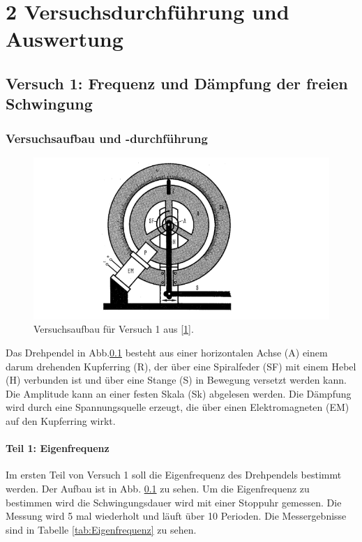 \chapter*{2 Versuchsdurchführung und Auswertung}
\setcounter{chapter}{2}
\setcounter{section}{0}
\setcounter{subsection}{0}

\section{Versuch 1: Frequenz und Dämpfung der freien Schwingung}

    \subsection{Versuchsaufbau und -durchführung}

        \begin{figure}[H]
            \centering
            \includegraphics[width=\textwidth]{bilder/aufbau_v1.png}
            \caption{Versuchsaufbau für Versuch 1 aus \hyperref[ref:Versuchsaufbau]{[1]}.}
            \label{fig:Aufbau1}
        \end{figure}

        Das Drehpendel in Abb.\ref{fig:Aufbau1} besteht aus einer horizontalen Achse (A) einem darum drehenden Kupferring (R), der über eine Spiralfeder (SF) mit einem Hebel (H) verbunden ist und über eine Stange (S) in Bewegung versetzt werden kann. Die Amplitude kann an einer festen Skala (Sk) abgelesen werden. Die Dämpfung wird durch eine Spannungsquelle erzeugt, die über einen Elektromagneten (EM) auf den Kupferring wirkt.
    
        \subsubsection{Teil 1: Eigenfrequenz}
        \label{sec:1.1}
            Im ersten Teil von Versuch 1 soll die Eigenfrequenz des Drehpendels bestimmt werden. Der Aufbau ist in Abb. \ref{fig:Aufbau1} zu sehen. Um die Eigenfrequenz zu bestimmen wird die Schwingungsdauer wird mit einer Stoppuhr gemessen. Die Messung wird 5 mal wiederholt und läuft über 10 Perioden.
            Die Messergebnisse sind in Tabelle \ref{tab:Eigenfrequenz} zu sehen.    

